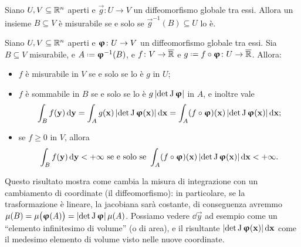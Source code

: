 \begin{teorema} \label{t:diffeomorfismo-misurabilita-insieme}
	Siano $U,V\subseteq\mathbb{R}^n$ aperti e $\vec g\colon U\to V$ un diffeomorfismo globale tra essi.
	Allora un insieme $B\subseteq V$ è misurabile se e solo se $\vec g^{-1}(B)\subseteq U$ lo è.
\end{teorema}
\begin{teorema} \label{t:composizione-diffeomorfismo-misurabile}
	Siano $U,V\subseteq\mathbb{R}^n$ aperti e $\bm{\upvarphi}\colon U\to V$ un diffeomorfismo globale tra essi.
	Sia $B\subseteq V$ misurabile, e $A\defeq\vphi^{-1}(B)$, e $f\colon V\to\overline{\mathbb{R}}$ e $g\defeq f\circ\vphi\colon U\to\Rex$.
	Allora:
	\begin{itemize}
		\item $f$ è misurabile in $V$ se e solo se lo è $g$ in $U$;
		\item $f$ è sommabile in $B$ se e solo se lo è $g\left|{\det\operatorname{J}\bm{\upvarphi}}\right|$ in $A$, e inoltre vale
			\begin{equation}
				\int_Bf(\mathbf{y})\,\textup{d}\mathbf{y}=\int_Ag(\mathbf{x})\left|{\det\operatorname{J}\bm{\upvarphi}(\mathbf{x})}\right|\textup{d}\mathbf{x}=\int_A(f\circ\bm{\upvarphi})(\mathbf{x})\left|{\det\operatorname{J}\bm{\upvarphi}(\mathbf{x})}\right|\textup{d}\mathbf{x};
			\end{equation}
		\item se $f\geq 0$ in $V$, allora
			\begin{equation}
				\int_Bf(\mathbf{y})\,\textup{d}\mathbf{y}<+\infty\text{ se e solo se }\int_A(f\circ\bm{\upvarphi})(\mathbf{x})\left|{\det\operatorname{J}\bm{\upvarphi}(\mathbf{x})}\right|\textup{d}\mathbf{x}<+\infty.
			\end{equation}
	\end{itemize}
\end{teorema}
Questo risultato mostra come cambia la misura di integrazione con un cambiamento di coordinate (il diffeomorfismo): in particolare, se la trasformazione è lineare, la jacobiana sarà costante, di conseguenza avremmo $\mu(B)=\mu\big(\bm{\upvarphi}(A)\big)=\left|{\det\operatorname{J}\bm{\upvarphi}}\right|\mu(A)$.
Possiamo vedere $\dd\vec y$ ad esempio come un ``elemento infinitesimo di volume'' (o di area), e il risultante $\left|{\det\operatorname{J}\bm{\upvarphi}(\mathbf{x})}\right|\textup{d}\mathbf{x}$ come il medesimo elemento di volume visto nelle nuove coordinate.

